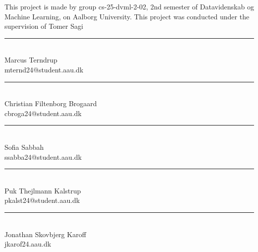 
This project is made by group cs-25-dvml-2-02, 2nd semester of Datavidenskab og Machine Learning, on Aalborg University. This project was conducted under the supervision of Tomer Sagi

\vspace{40 mm} 
\begin{minipage}[b]{0.45\textwidth}
	\centering
	\rule{\textwidth}{0.5pt}\\
	Marcus Terndrup \\
	{\footnotesize mternd24@student.aau.dk
	}
\end{minipage}
\hfill
\vspace{40 mm}
\begin{minipage}[b]{0.45\textwidth}
	\centering
	\rule{\textwidth}{0.5pt}\\
	Christian Filtenborg Brogaard\\
	{\footnotesize cbroga24@student.aau.dk
	}
\end{minipage}
\hfill
\begin{minipage}[b]{0.45\textwidth}
	\centering
	\rule{\textwidth}{0.5pt}\\
	Sofia Sabbah \\
	{\footnotesize ssabba24@student.aau.dk
	}
\end{minipage}
\hfill
\begin{minipage}[b]{0.45\textwidth}
	\centering
	\rule{\textwidth}{0.5pt}\\
	Puk Thejlmann Kalstrup\\
	{\footnotesize pkalst24@student.aau.dk}
\end{minipage}
\hfill
\vspace{40 mm}
\begin{minipage}[b]{0.45\textwidth}
	\centering
	\rule{\textwidth}{0.5pt}\\
	Jonathan Skovbjerg Karoff\\
	{\footnotesize jkarof24.aau.dk
	}
\end{minipage}